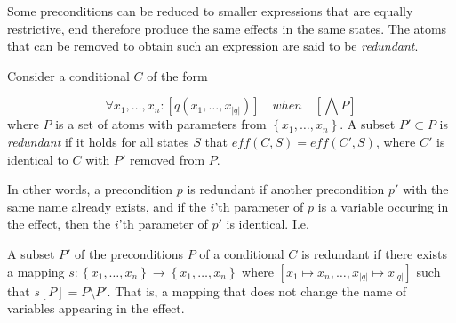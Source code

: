 \documentclass[../Master.tex]{subfiles}
\begin{document}
Some preconditions can be reduced to smaller expressions that are equally restrictive, end therefore produce the same effects in the same states. The atoms that can be removed to obtain such an expression are said to be \textit{redundant}.

\begin{definition}\label{def:ca:redundantps}
Consider a conditional $C$ of the form

    \begin{equation*}
        \forall x_1, \dots, x_n : [q\left(x_1, \dots, x_{|q|}\right)] \quad when \quad \left[\bigwedge P\right]
    \end{equation*}
    where $P$ is a set of atoms with parameters from $\left\{x_1, \dots, x_n \right\}$.
    A subset $P' \subset P$ is \emph{redundant} if it holds for all states $S$ that $eff (C,S) = eff \left(C',S\right)$, where $C'$ is identical to $C$ with $P'$ removed from $P$.
\end{definition}

In other words, a precondition $p$ is redundant if another precondition $p'$ with the same name already exists, and if the $i$'th parameter of $p$ is a variable occuring in the effect, then the $i$'th parameter of $p'$ is identical. I.e.\ 

\begin{proposition}\label{prop:ca:redundantps}
    A subset $P'$ of the preconditions $P$ of a conditional $C$ is redundant if there exists a mapping $s : \left\{ x_1, \dots, x_n \right\} \rightarrow \left\{ x_1, \dots, x_n \right\}$ where $\left[ x_1 \mapsto x_n, \dots, x_{|q|} \mapsto x_{|q|}\right]$ such that $s \left[P\right] = P \setminus P'$. That is, a mapping that does not change the name of variables appearing in the effect.
\end{proposition}
\end{document}
